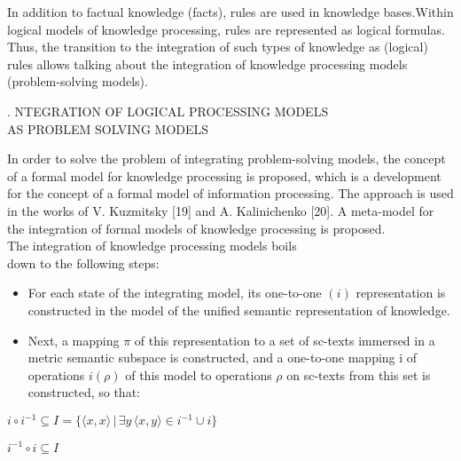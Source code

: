 \documentclass{article}
\newcommand{\RomanNumeralCaps}[1]
    {\MakeUppercase{\romannumeral #1}}
\begin{document}
\begin{multicols}{2}
\begin{spacing}{0}
\hspace*{0,27cm}In addition to factual knowledge (facts), rules are used\!
in knowledge bases.Within logical models of knowledge\!
processing, rules are represented as logical formulas. Thus,\!
the transition to the integration of such types of knowledge\!
as (logical) rules allows talking about the integration of\!
knowledge processing models (problem-solving models).\!
\end{spacing}



\begin{center}
\RomanNumeralCaps{3}. \RomanNumeralCaps{1}\scriptsize NTEGRATION OF LOGICAL PROCESSING MODELS \\
AS PROBLEM SOLVING MODELS
\end{center}


\hspace{0.27cm}In order to solve the problem of integrating problem-solving models, the concept of a formal model for knowledge processing is proposed, which is a development for
the concept of a formal model of information processing.
The approach is used in the works of V. Kuzmitsky
[19] and A. Kalinichenko [20]. A meta-model for the
integration of formal models of knowledge processing is
proposed.\\
\vspace{0.5pt}
\hspace{0.27cm}The integration of knowledge processing models boils\\down to the following steps:
\begin{itemize}
    \item For each state of the integrating model, its one-to-one $\left(i\right)$ representation is constructed in the model of
the unified semantic representation of knowledge.
     \item Next, a mapping $\pi$ of this representation to a set of sc-texts immersed in a metric semantic subspace is constructed, and a one-to-one mapping i of operations $i\left(\rho\right)$ of this model to operations $\rho$ on sc-texts from this set is constructed, so that:\newline
\end{itemize}


\centerline{$i \circ i^{-1} \subseteq I = \{\langle x, x \rangle \,|\, \exists y \, \langle x, y \rangle \in i^{-1} \cup i\}$}
\vspace{19pt}
\centerline{$i^{-1} \circ i \subseteq I$}




\end{multicols}
\end{document}
